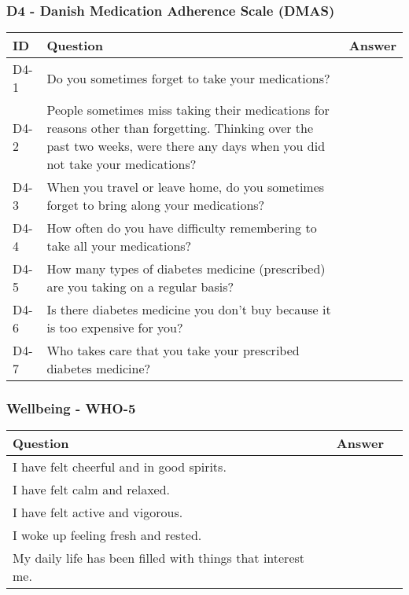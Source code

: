 \subsubsection{D4 - Danish Medication Adherence Scale (DMAS)}
\begin{table}[H]
    \centering
    \renewcommand{\arraystretch}{1.2}
    \begin{tabularx}{\textwidth}{|l|X|l|}
        \hline
        \textbf{ID} & \textbf{Question} & \textbf{Answer} \\ \hline
        D4-1 & Do you sometimes forget to take your medications? &  \\ \hline
        D4-2 & People sometimes miss taking their medications for reasons other than forgetting. Thinking over the past two weeks, were there any days when you did not take your medications? &  \\ \hline
        D4-3 & When you travel or leave home, do you sometimes forget to bring along your medications? &  \\ \hline
        D4-4 & How often do you have difficulty remembering to take all your medications? &  \\ \hline
        D4-5 & How many types of diabetes medicine (prescribed) are you taking on a regular basis? &  \\ \hline
        D4-6 & Is there diabetes medicine you don't buy because it is too expensive for you? &  \\ \hline
        D4-7 & Who takes care that you take your prescribed diabetes medicine? &  \\ \hline
    \end{tabularx}
\end{table}

\subsubsection{Wellbeing - WHO-5}
\begin{table}[H]
    \centering
    \renewcommand{\arraystretch}{1.2}
    \begin{tabularx}{\textwidth}{|l|X|l|}
        \hline
        \textbf{Question} & \textbf{Answer} \\ \hline
        I have felt cheerful and in good spirits. &  \\ \hline
        I have felt calm and relaxed. &  \\ \hline
        I have felt active and vigorous. &  \\ \hline
        I woke up feeling fresh and rested. &  \\ \hline
        My daily life has been filled with things that interest me. &  \\ \hline
    \end{tabularx}
\end{table}

